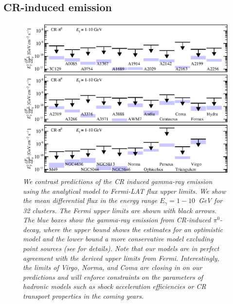\documentclass[10pt,aps,pra,reprint,amsmath,amsfonts,amssymb,showpacs,nofootinbib,floatfix]{revtex4-1}
\begin{document}
\subsection{CR-induced emission}

\begin{figure}
\begin{minipage}{2.0\columnwidth}
  \includegraphics[width=0.99\columnwidth]{figures/Fermi.comp.CR.diff.eps}
  \caption{\it We contrast predictions of the CR induced gamma-ray
    emission using the analytical model \protect
    \cite{2010MNRAS.409..449P} to Fermi-LAT flux upper limits. We show
    the mean differential flux in the energy range $E_\gamma=1-10$~GeV
    for 32 clusters. The Fermi upper limits are shown with black
    arrows. The blue boxes show the gamma-ray emission from
    CR-induced $\pi^0$-decay, where the upper bound shows the
    estimates for an optimistic model and the lower bound a more
    conservative model excluding point sources (see
    \cite{2010MNRAS.409..449P} for details). Note that our models are
    in perfect agreement with the derived upper limits from
    Fermi. Interestingly, the limits of Virgo, Norma, and Coma are
    closing in on our predictions and will enforce constraints on the
    parameters of hadronic models such as shock acceleration
    efficiencies or CR transport properties in the coming years.}
 \label{fig15}
\end{minipage}
\end{figure}
\end{document}
